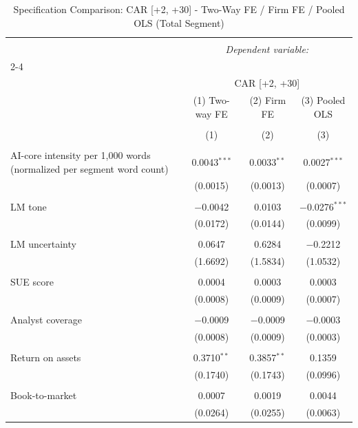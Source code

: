
\begin{table}[!htbp] \centering 
  \caption{Specification Comparison: CAR [+2, +30] - Two-Way FE / Firm FE / Pooled OLS (Total Segment)} 
  \label{} 
\begin{tabular}{@{\extracolsep{5pt}}lccc} 
\\[-1.8ex]\hline 
\hline \\[-1.8ex] 
 & \multicolumn{3}{c}{\textit{Dependent variable:}} \\ 
\cline{2-4} 
\\[-1.8ex] & \multicolumn{3}{c}{CAR [+2, +30]} \\ 
 & (1) Two-way FE & (2) Firm FE & (3) Pooled OLS \\ 
\\[-1.8ex] & (1) & (2) & (3)\\ 
\hline \\[-1.8ex] 
 AI-core intensity per 1,000 words (normalized per segment word count) & 0.0043$^{***}$ & 0.0033$^{**}$ & 0.0027$^{***}$ \\ 
  & (0.0015) & (0.0013) & (0.0007) \\ 
  & & & \\ 
 LM tone & $-$0.0042 & 0.0103 & $-$0.0276$^{***}$ \\ 
  & (0.0172) & (0.0144) & (0.0099) \\ 
  & & & \\ 
 LM uncertainty & 0.0647 & 0.6284 & $-$0.2212 \\ 
  & (1.6692) & (1.5834) & (1.0532) \\ 
  & & & \\ 
 SUE score & 0.0004 & 0.0003 & 0.0003 \\ 
  & (0.0008) & (0.0009) & (0.0007) \\ 
  & & & \\ 
 Analyst coverage & $-$0.0009 & $-$0.0009 & $-$0.0003 \\ 
  & (0.0008) & (0.0009) & (0.0003) \\ 
  & & & \\ 
 Return on assets & 0.3710$^{**}$ & 0.3857$^{**}$ & 0.1359 \\ 
  & (0.1740) & (0.1743) & (0.0996) \\ 
  & & & \\ 
 Book-to-market & 0.0007 & 0.0019 & 0.0044 \\ 
  & (0.0264) & (0.0255) & (0.0063) \\ 

\end{tabular}
\end{table}
